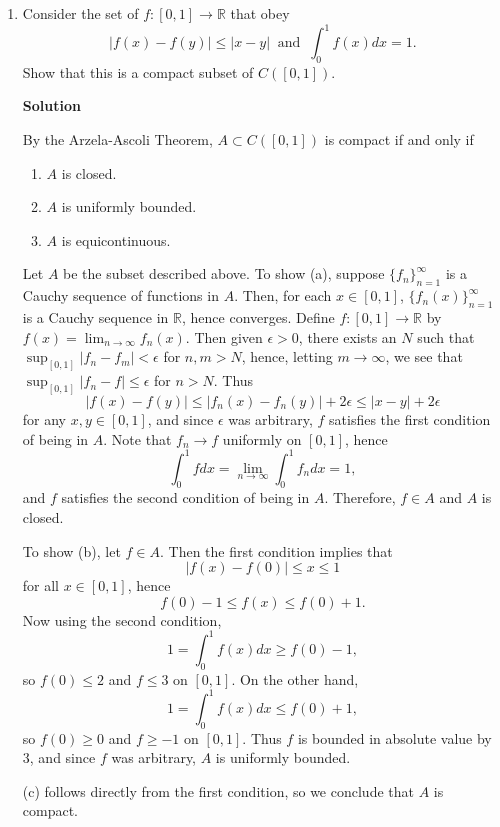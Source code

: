 \documentclass{article}
\begin{document}
\begin{enumerate}
{\bf Solution}

(F04.1)



\item Consider the set of \(f : [0,1] \to \mathbb{R}\) that obey
\[|f(x) - f(y)| \leq |x - y| \ \text{ and } \ \int_0^1 f(x) dx = 1.\]
Show that this is a compact subset of \(C([0,1])\).

{\bf Solution}

By the Arzela-Ascoli Theorem, \(A \subset C([0,1])\) is compact if and only if
\begin{enumerate}
\item \(A\) is closed.
\item \(A\) is uniformly bounded.
\item \(A\) is equicontinuous.
\end{enumerate}
Let \(A\) be the subset described above.  To show (a), suppose \(\{f_n\}_{n = 1}^{\infty}\) is a Cauchy sequence of functions in \(A\).  Then, for each \(x \in [0,1]\), \(\{f_n(x)\}_{n = 1}^{\infty}\) is a Cauchy sequence in \(\mathbb{R}\), hence converges.  Define \(f : [0,1] \to \mathbb{R}\) by \(f(x) = \lim_{n \to \infty} f_n(x)\).  Then given \(\epsilon > 0\), there exists an \(N\) such that \(\sup_{[0,1]} |f_n - f_m| < \epsilon\) for \(n,m > N\), hence, letting \(m \to \infty\), we see that \(\sup_{[0,1]} |f_n - f| \leq \epsilon\) for \(n > N\).  Thus
\[|f(x) - f(y)| \leq |f_n(x) - f_n(y)| + 2\epsilon \leq |x - y| + 2\epsilon\]
for any \(x,y \in [0,1]\), and since \(\epsilon\) was arbitrary, \(f\) satisfies the first condition of being in \(A\).  Note that \(f_n \to f\) uniformly on \([0,1]\), hence
\[\int_0^1 f dx = \lim_{n \to \infty} \int_0^1 f_n dx = 1,\]
and \(f\) satisfies the second condition of being in \(A\).  Therefore, \(f \in A\) and \(A\) is closed.

To show (b), let \(f \in A\).  Then the first condition implies that
\[|f(x) - f(0)| \leq x \leq 1\]
for all \(x \in [0,1]\), hence
\[f(0) - 1 \leq f(x) \leq f(0) + 1.\]
Now using the second condition,
\[1 = \int_0^1 f(x) dx \geq f(0) - 1,\]
so \(f(0) \leq 2\) and \(f \leq 3\) on \([0,1]\).  On the other hand,
\[1 = \int_0^1 f(x) dx \leq f(0) + 1,\]
so \(f(0) \geq 0\) and \(f \geq -1\) on \([0,1]\).  Thus \(f\) is bounded in absolute value by \(3\), and since \(f\) was arbitrary, \(A\) is uniformly bounded.

(c) follows directly from the first condition, so we conclude that \(A\) is compact.




\end{enumerate}
\end{document}
